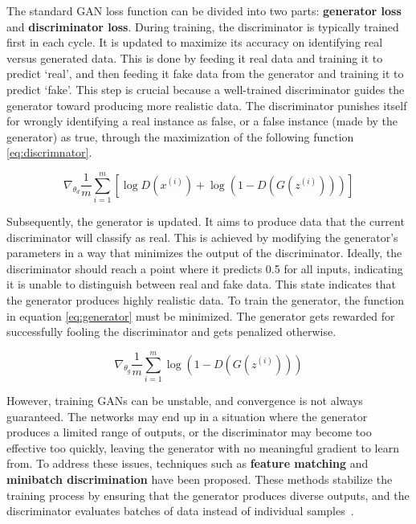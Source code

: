 The standard GAN loss function can be divided into two parts: \textbf{generator loss} and \textbf{discriminator loss}. During training, the discriminator is typically trained first in each cycle. It is updated to maximize its accuracy on identifying real versus generated data. This is done by feeding it real data and training it to predict ‘real’, and then feeding it fake data from the generator and training it to predict ‘fake’. This step is crucial because a well-trained discriminator guides the generator toward producing more realistic data. The discriminator punishes itself for wrongly identifying a real instance as false, or a false instance (made by the generator) as true, through the maximization of the following function \ref{eq:discrimnator}.

\begin{equation}
    \nabla_{\theta_d} \frac{1}{m} \sum_{i=1}^{m} \left[ \log D \left( x^{(i)} \right) + \log \left(1 - D \left( G \left( z^{(i)} \right)\right)\right) \right]
    \label{eq:discrimnator}
\end{equation}

Subsequently, the generator is updated. It aims to produce data that the current discriminator will classify as real. This is achieved by modifying the generator's parameters in a way that minimizes the output of the discriminator. Ideally, the discriminator should reach a point where it predicts 0.5 for all inputs, indicating it is unable to distinguish between real and fake data. This state indicates that the generator produces highly realistic data. To train the generator, the function in equation \ref{eq:generator} must be minimized. The generator gets rewarded for successfully fooling the discriminator and gets penalized otherwise. 

\begin{equation}
    \nabla_{\theta_g} \frac{1}{m} \sum_{i=1}^{m} \log \left(1 - D \left( G \left( z^{(i)} \right)\right)\right)
    \label{eq:generator}
\end{equation}

However, training GANs can be unstable, and convergence is not always guaranteed. The networks may end up in a situation where the generator produces a limited range of outputs, or the discriminator may become too effective too quickly, leaving the generator with no meaningful gradient to learn from. To address these issues, techniques such as \textbf{feature matching} and \textbf{minibatch discrimination} have been proposed. These methods stabilize the training process by ensuring that the generator produces diverse outputs, and the discriminator evaluates batches of data instead of individual samples~\cite{GANOverview}.


